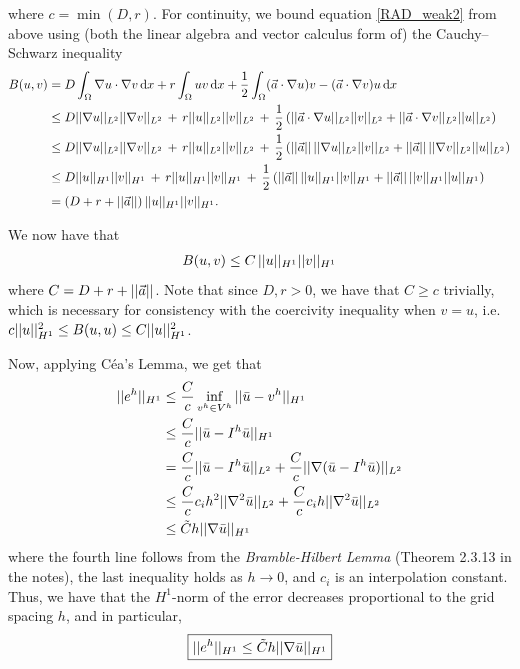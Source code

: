\begin{solution}
where $c = \min(D,r)$.
For continuity, we bound equation \eqref{RAD_weak2} from above using (both the linear algebra and vector calculus form of) the Cauchy–Schwarz inequality
\begin{align*}
B(u,v) & =
D \int_\Omega \nabla u \cdot \nabla v \operatorname{d}\!{x} +
r \int_\Omega u v \operatorname{d}\!{x} + 
\frac{1}{2} \int_\Omega (\vec{a} \cdot \nabla u) v - (\vec{a} \cdot \nabla v) u \operatorname{d}\!{x} \\
&\leq
D ||\nabla u||_{L^2} ||\nabla v||_{L^2} \, + \,
r ||u||_{L^2} ||v||_{L^2} \, + \,
\frac{1}{2} \left(
||\vec{a} \cdot \nabla u||_{L^2} ||v||_{L^2} + 
||\vec{a} \cdot \nabla v||_{L^2} ||u||_{L^2}
\right) \\
&\leq
D ||\nabla u||_{L^2} ||\nabla v||_{L^2} \, + \,
r ||u||_{L^2} ||v||_{L^2} \, + \,
\frac{1}{2} \left(
||\vec{a}|| \, ||\nabla u||_{L^2} ||v||_{L^2} + 
||\vec{a}|| \, ||\nabla v||_{L^2} ||u||_{L^2}
\right) \\
&\leq
D ||u||_{H^1} ||v||_{H^1} \, + \,
r ||u||_{H^1} ||v||_{H^1} \, + \,
\frac{1}{2} \left(
||\vec{a}|| \, ||u||_{H^1} ||v||_{H^1} + 
||\vec{a}|| \, ||v||_{H^1} ||u||_{H^1}
\right) \\
&=
(D + r + ||\vec{a}||) \, ||u||_{H^1} ||v||_{H^1}.
\end{align*}

We now have that
\begin{align}\label{H1_continuity}
B(u,v) \leq C \, ||u||_{H^1} ||v||_{H^1}
\end{align}
where $C = D + r + ||\vec{a}||$.
Note that since $D,r > 0$, we have that $C \geq c$ trivially, which is necessary for consistency with the coercivity inequality when $v=u$, i.e. $c ||u||_{H^1}^2 \leq B(u,u) \leq C ||u||_{H^1}^2 $.

Now, applying C\'ea's Lemma, we get that
\begin{align*}
||e^h||_{H^1}
&\leq \frac{C}{c} \inf_{v^h \in V^h} ||\bar{u} - v^h||_{H^1} \\
&\leq \frac{C}{c} ||\bar{u} - I^h \bar{u}||_{H^1} \\
&= \frac{C}{c} ||\bar{u} - I^h \bar{u}||_{L^2} + 
\frac{C}{c} ||\nabla ( \bar{u} - I^h \bar{u} )||_{L^2} \\
&\leq
\frac{C}{c} c_i h^2 ||\nabla^2 \bar{u}||_{L^2} + 
\frac{C}{c} c_i h   ||\nabla^2 \bar{u}||_{L^2} \\
&\leq
\tilde{C} h ||\nabla \bar{u}||_{H^1}
\end{align*}
where the fourth line follows from the \textit{Bramble-Hilbert Lemma} (Theorem 2.3.13 in the notes), the last inequality holds as $h \rightarrow 0$, and $c_i$ is an interpolation constant.
Thus, we have that the $H^1$-norm of the error decreases proportional to the grid spacing $h$, and in particular,
\begin{align}\label{H1_errorBound}
\boxed{ ||e^h||_{H^1} \leq \tilde{C} h ||\nabla \bar{u}||_{H^1} }
\end{align}


\end{solution}
